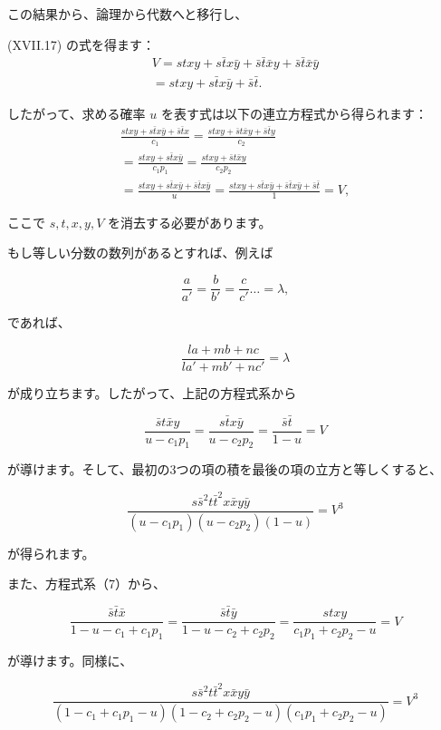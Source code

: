 \documentclass[a4paper,11pt,openany]{ltjsbook}
\begin{document}
この結果から、論理から代数へと移行し、

(XVII.17) の式を得ます：
\begin{gather*}
V = stxy + s\bar{t}x\bar{y} + \bar{s}\bar{t}\bar{x}y + \bar{s}\bar{t}\bar{x}\bar{y}\\
= stxy + s\bar{t}x\bar{y} + \bar{s}\bar{t}.
\end{gather*}

したがって、求める確率 \( u \) を表す式は以下の連立方程式から得られます：
\begin{equation*}
\tag{7}
\begin{split}
\frac{stxy + s\bar{t}x\bar{y} + \bar{s}\bar{t}x}{c_1}
= \frac{stxy + \bar{s}t\bar{x}y + \bar{s}\bar{t}y}{c_2} \\
= \frac{stxy + s\bar{t}x\bar{y}}{c_1 p_1}
= \frac{stxy + \bar{s}t\bar{x}y}{c_2 p_2} \\
= \frac{stxy + s\bar{t}x\bar{y} + \bar{s}\bar{t}x\bar{y}}{u}
= \frac{stxy + s\bar{t}x\bar{y} + \bar{s}\bar{t}x\bar{y} + \bar{s}\bar{t}}{1} = V,
\end{split}
\end{equation*}

ここで \( s, t, x, y, V \) を消去する必要があります。

もし等しい分数の数列があるとすれば、例えば

\[
\frac{a}{a'} = \frac{b}{b'} = \frac{c}{c'} \dotso = \lambda,
\]

であれば、

\[
\frac{la + mb + nc}{la' + mb' + nc'} = \lambda
\]

が成り立ちます。したがって、上記の方程式系から

\[
\frac{\bar{s}t\bar{x}y}{u - c_1 p_1} = \frac{s\bar{t}x\bar{y}}{u - c_2 p_2} = \frac{\bar{s}\bar{t}}{1 - u} = V
\]

が導けます。そして、最初の3つの項の積を最後の項の立方と等しくすると、

\[
\frac{s \bar{s}^2 t \bar{t}^2 x \bar{x} y \bar{y}}{(u - c_1 p_1)(u - c_2 p_2)(1 - u)} = V^3
\]

が得られます。

また、方程式系（7）から、

\[
\frac{\bar{s}\bar{t}\bar{x}}{1 - u - c_1 + c_1 p_1} = \frac{\bar{s}\bar{t}\bar{y}}{1 - u - c_2 + c_2 p_2} = \frac{stxy}{c_1 p_1 + c_2 p_2 - u} = V
\]

が導けます。同様に、

\[
\frac{s \bar{s}^2 t \bar{t}^2 x \bar{x} y \bar{y}}{(1 - c_1 + c_1 p_1 - u)(1 - c_2 + c_2 p_2 - u)(c_1 p_1 + c_2 p_2 - u)} = V^3
\]
\end{document}
